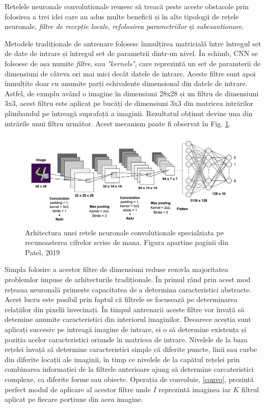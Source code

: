 \documentclass[a4paper,12pt]{book}
\begin{document}
				Rețelele neuronale convolutionale reușesc să treacă peste aceste obstacole prin folosirea a trei idei care au adus multe beneficii și în alte tipologii de rețele neuronale,\textit{ filtre de recepție locale}, \textit{refolosirea parametriilor} și \textit{subesantionare}. \par
				
				Metodele tradiționale de antrenare folosesc înmulțirea matricială între întregul set de date de intrare și întregul set de parametrii dintr-un nivel. În schimb, CNN se folsoesc de așa numite \textit{filtre}, sau \textit{"kernels"}, care reprezintă un set de paramterii de dimensiuni de câteva ori mai mici decât datele de intrare. Aceste filtre sunt apoi înmulțite doar cu anumite parți echivalente dimensional din datele de intrare. Astfel, de exmplu având o imagine în dimensiuni 28x28 și un filtru de dimensiuni 3x3, acest filtru este aplicat pe bucăți de dimensiuni 3x3 din matricea intrărilor plimbandul pe întreagă suprafață a imaginii. Rezultatul obținut devine una din intrările unui filtru următor. Acest mecanism poate fi observat în Fig. \ref{fig:cnns}.
					
				\begin{figure}[h]
					\centering
					\includegraphics[scale=0.23]{cnns}
					\caption{Arhitectura unei retele neuronale convolutionale specialziata pe recunoasterea cifrelor scrise de mana. Figura apartine paginii din Patel, 2019 \cite{cnn_photo}}
					\label{fig:cnns}
				\end{figure}
				
				Simpla folosire a acestor filtre de dimensiuni reduse rezovla majoritatea problemlor impuse de arhitecturile tradiționale. În primul rând prin acest mod rețeaua neuronală primește capacitatea de a determina caracteristici abstracte. Acest lucru este posibil prin faptul că filtrele se focusează pe determinarea relațiilor din pixelii învecinați. În timpul antrenarii aceste filtre vor învață să detemine anumite caracteristici din interiorul imaginilor. Deoarece aceștia sunt aplicați succesiv pe intreagă imagine de intrare, ei o să determine existența și poziția acelor caracteristici oriunde în matricea de intrare. Nivelele de la baza rețelei învață să determine caracteristici simple că diferite puncte, linii sau curbe din diferite locații ale imaginii, în timp ce nivelele de la capătul rețelei prin combinarea informației de la filtrele anterioare ajung să determine carcateristici complexe, ca diferite forme sau obiecte. Operația de convoluie, \ref{convo}, prezintă perfect modul de aplicare al acestor filtre unde $I$ reprezintă imaginea iar $K$ filtrul aplicat pe fiecare porțiune din acea imagine.\par
				
\end{document}
